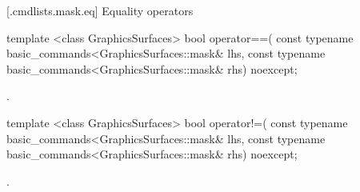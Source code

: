  [\iotwod.cmdlists.mask.eq] {Equality operators}%

%
\begin{itemdecl}
template <class GraphicsSurfaces>
bool operator==(
  const typename basic_commands<GraphicsSurfaces::mask& lhs,
  const typename basic_commands<GraphicsSurfaces::mask& rhs) 
  noexcept;
\end{itemdecl}
\begin{itemdescr}
\pnum
\returns {}.
\end{itemdescr}

%
\begin{itemdecl}
template <class GraphicsSurfaces>
bool operator!=(
  const typename basic_commands<GraphicsSurfaces::mask& lhs,
  const typename basic_commands<GraphicsSurfaces::mask& rhs) 
  noexcept;
\end{itemdecl}
\begin{itemdescr}
\pnum
\returns {}.
\end{itemdescr}
